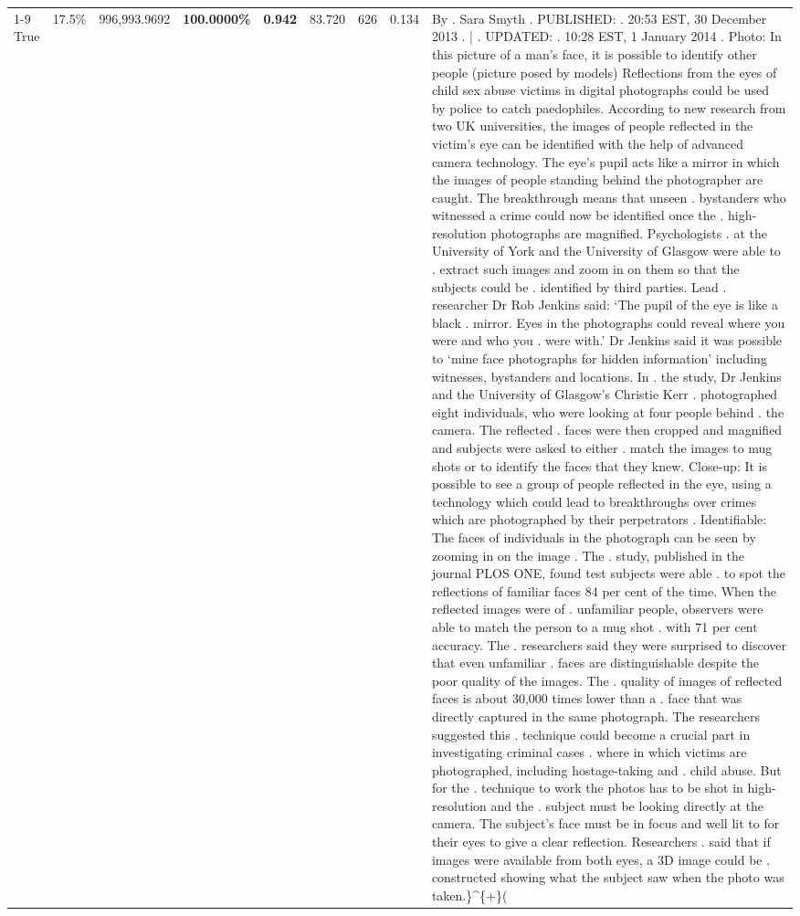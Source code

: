 \begin{table}[H]
\begin{tabular}{lllrlllll}
\cline{1-9} \cline{2-9}
True & 17.5\% & 996,993.9692 & \bfseries \color{red} 100.0000\% & \bfseries \color{red} 0.942 & 83.720 & 626 & 0.134 & By . Sara Smyth . PUBLISHED: . 20:53 EST, 30 December 2013 . | . UPDATED: . 10:28 EST, 1 January 2014 . Photo: In this picture of a man's face, it is possible to identify other people (picture posed by models) Reflections from the eyes of child sex abuse victims in digital photographs could be used by police to catch paedophiles. According to new research from two UK universities, the images of people reflected in the victim's eye can be identified with the help of advanced camera technology. The eye's pupil acts like a mirror in which the images of people standing behind the photographer are caught. The breakthrough means that unseen . bystanders who witnessed a crime could now be identified once the . high-resolution photographs are magnified. Psychologists . at the University of York and the University of Glasgow were able to . extract such images and zoom in on them so that the subjects could be . identified by third parties. Lead . researcher Dr Rob Jenkins said: ‘The pupil of the eye is like a black . mirror. Eyes in the photographs could reveal where you were and who you . were with.' Dr Jenkins said it was possible to ‘mine face photographs for hidden information' including witnesses, bystanders and locations. In . the study, Dr Jenkins and the University of Glasgow's Christie Kerr . photographed eight individuals, who were looking at four people behind . the camera. The reflected . faces were then cropped and magnified and subjects were asked to either . match the images to mug shots or to identify the faces that they knew. Close-up: It is possible to see a group of people reflected in the eye, using a technology which could lead to breakthroughs over crimes which are photographed by their perpetrators . Identifiable: The faces of individuals in the photograph can be seen by zooming in on the image . The . study, published in the journal PLOS ONE, found test subjects were able . to spot the reflections of familiar faces 84 per cent of the time. When the reflected images were of . unfamiliar people, observers were able to match the person to a mug shot . with 71 per cent accuracy. The . researchers said they were surprised to discover that even unfamiliar . faces are distinguishable despite the poor quality of the images. The . quality of images of reflected faces is about 30,000 times lower than a . face that was directly captured in the same photograph. The researchers suggested this . technique could become a crucial part in investigating criminal cases . where in which victims are photographed, including hostage-taking and . child abuse. But for the . technique to work the photos has to be shot in high-resolution and the . subject must be looking directly at the camera. The subject's face must be in focus and well lit to for their eyes to give a clear reflection. Researchers . said that if images were available from both eyes, a 3D image could be . constructed showing what the subject saw when the photo was taken.\}\textasciicircum \{+\}( \\

\end{tabular}
\end{table}
